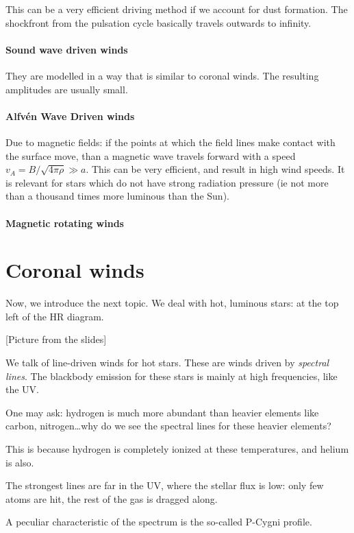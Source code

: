 \documentclass[main.tex]{subfiles}
\begin{document}
This can be a very efficient driving method if we account for dust formation. The shockfront from the pulsation cycle basically travels outwards to infinity.

\paragraph{Sound wave driven winds}
They are modelled in a way that is similar to coronal winds. 
The resulting amplitudes are usually small. 

\paragraph{Alfvén Wave Driven winds}
Due to magnetic fields: if the points at which the field lines make contact with the surface move, than a magnetic wave travels forward with a speed \(v_A = B / \sqrt{4 \pi \rho } \gg a\). 
This can be very efficient, and result in high wind speeds. 
It is relevant for stars which do not have strong radiation pressure (ie not more than a thousand times more luminous than the Sun). 

\paragraph{Magnetic rotating winds}


\section{Coronal winds}

Now, we introduce the next topic.
We deal with hot, luminous stars: at the top left of the HR diagram.

[Picture from the slides]

We talk of line-driven winds for hot stars.
These are winds driven by \emph{spectral lines}. 
The blackbody emission for these stars is mainly at high frequencies, like the UV.

One may ask: hydrogen is much more abundant than heavier elements like carbon, nitrogen\dots why do we see the spectral lines for these heavier elements?

This is because hydrogen is completely ionized at these temperatures, and helium is also.

The strongest lines are far in the UV, where the stellar flux is low: only few atoms are hit, the rest of the gas is dragged along.

A peculiar characteristic of the spectrum is the so-called P-Cygni profile.
\end{document}
